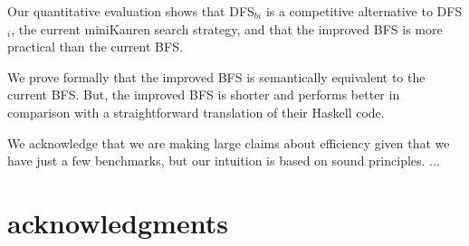 \documentclass[format=acmlarge, review=true, authordraft=true]{acmart}
\newcommand{\DFSi }[0]{DFS$_{i}$}
\newcommand{\DFSbi}[0]{DFS$_{bi}$}
\newcommand{\BFSser}[0]{the current BFS}
\newcommand{\BFSimp}[0]{the improved BFS}
\begin{document}
Our quantitative evaluation shows that \DFSbi{} is a competitive 
alternative to \DFSi{}, the current miniKanren search strategy,
and that \BFSimp{} is more practical than \BFSser{}. 

We prove formally that \BFSimp{} is semantically equivalent to \BFSser{}. But, 
\BFSimp{} is shorter and performs better in comparison with a straightforward 
translation of their Haskell code.


We acknowledge that we are making large claims about efficiency given that we 
have just a few benchmarks, but our intuition is based on sound principles. ...


\section*{acknowledgments}



\end{document}
